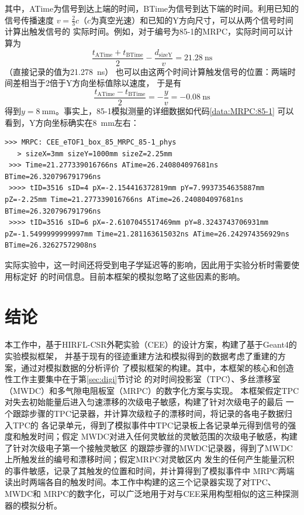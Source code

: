 \documentclass[bachelor,openany,oneside,color]{buaathesis}
\begin{document}
其中，ATime为信号到达上端的时间，BTime为信号到达下端的时间。利用已知的信号传播速度
$v=\frac23c$（$c$为真空光速）和已知的Y方向尺寸，可以从两个信号时间计算出触发信号的
实际时间。例如，对于编号为85-1的MRPC，实际时间可以计算为
\begin{equation}
\frac{t_{\text{ATime}}+t_{\text{BTime}} }{2}-\frac{d_{\text{sizeY}} }{v}
	=\SI{21.28}{\nano\second}
\end{equation}
（直接记录的值为\SI{21.278}{\nano\second}）
也可以由这两个时间计算触发信号的位置：两端时间差相当于2倍于Y方向坐标值除以速度，
于是有
\begin{equation}
\frac{t_{\text{ATime}}-t_{\text{BTime}} }{2}=-\frac{y}{v}=\SI{-0.08}{\nano\second}
\end{equation}
得到$y=\SI{8}{\milli\meter}$。事实上，85-1模拟测量的详细数据如代码\ref{data:MRPC:85-1}
可以看到，Y方向坐标确实在\SI{8}{\milli\meter}左右：
\begin{lstlisting}[caption={eTOF1-MRPC-85-1},label={data:MRPC:85-1},firstnumber=4449,lastline=4453]
 >>> MRPC: CEE_eTOF1_box_85_MRPC_85-1_phys
   > sizeX=3mm sizeY=1000mm sizeZ=2.25mm 
 >>> Time=21.277339016766ns ATime=26.240804097681ns BTime=26.320796791796ns
 >>>> tID=3516 sID=4 pX=-2.154416372819mm pY=7.9937354635887mm pZ=-2.25mm Time=21.277339016766ns ATime=26.240804097681ns BTime=26.320796791796ns
 >>>> tID=3516 sID=6 pX=-2.6107045517469mm pY=8.3243743706931mm pZ=-1.5499999999997mm Time=21.281163615032ns ATime=26.242974356929ns BTime=26.32627572908ns
\end{lstlisting}

实际实验中，这一时间还将受到电子学延迟等的影响，因此用于实验分析时需要使用标定好
的时间信息。目前本框架的模拟忽略了这些因素的影响。


\chapter*{结论}
本工作中，基于HIRFL-CSR外靶实验（CEE）的设计方案，构建了基于Geant4的实验模拟框架，
并基于现有的径迹重建方法和模拟得到的数据考虑了重建的方案，通过对模拟数据的分析评价
了模拟框架的构建。其中，本框架的核心和创造性工作主要集中在于第\ref{sec:digi}节讨论
的对时间投影室（TPC）、多丝漂移室（MWDC）和多气隙电阻板室（MRPC）的数字化方案与实现。
本框架假定TPC对失去初始能量后进入匀速漂移的次级电子敏感，构建了针对次级电子的最后
一个跟踪步骤的TPC记录器，并计算次级粒子的漂移时间，将记录的各电子数据归入TPC的
各记录单元，得到了模拟事件中TPC记录板上各记录单元得到信号的强度和触发时间；假定
MWDC对进入任何灵敏丝的灵敏范围的次级电子敏感，构建了针对次级电子第一个接触灵敏区
的跟踪步骤的MWDC记录器，得到了MWDC上所触发丝的编号和漂移时间；假定MRPC对灵敏区内
发生的任何产生能量沉积的事件敏感，记录了其触发的位置和时间，并计算得到了模拟事件中
MRPC两端读出时两端各自的触发时间。本工作中构建的这三个记录器实现了对TPC、MWDC和
MRPC的数字化，可以广泛地用于对与CEE采用构型相似的这三种探测器的模拟分析。
\end{document}
